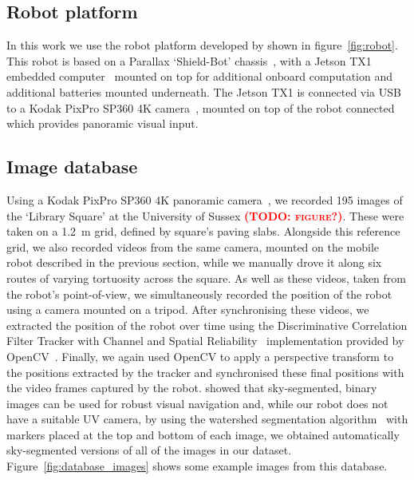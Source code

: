 \documentclass[letterpaper]{article}
\newcommand{\todo}[1]{\textbf{\textsc{\textcolor{red}{(TODO: #1)}}}}
\begin{document}
\subsection{Robot platform}
\label{sec:robot_platform}
In this work we use the robot platform developed by \citet{Domcsek2018} shown in figure~\ref{fig:robot}.
This robot is based on a Parallax `Shield-Bot' chassis~\citep{ParallaxInc}, with a Jetson TX1 embedded computer~\citep{NVIDIACorporation2016} mounted on top for additional onboard computation and additional batteries mounted underneath. 
The Jetson TX1 is connected via USB to a Kodak PixPro SP360 4K camera~\citep{JKImagingLtd}, mounted on top of the robot connected which provides panoramic visual input.

\subsection{Image database}
\label{sec:image_database}
Using a Kodak PixPro SP360 4K panoramic camera~\citep{JKImagingLtd}, we recorded 195 images of the ‘Library Square’ at the University of Sussex \todo{figure?}. 
These were taken on a \SI{1.2}{\metre} grid, defined by square’s paving slabs. 
Alongside this reference grid, we also recorded videos from the same camera, mounted on the mobile robot described in the previous section, while we manually drove it along six routes of varying tortuosity across the square. 
As well as these videos, taken from the robot’s point-of-view, we simultaneously recorded the position of the robot using a camera mounted on a tripod. 
After synchronising these videos, we extracted the position of the robot over time using the Discriminative Correlation Filter Tracker with Channel and Spatial Reliability~\citep{Lukezic2018} implementation provided by OpenCV~\citep{OpenCV}.
Finally, we again used OpenCV to apply a perspective transform to the positions extracted by the tracker and synchronised these final positions with the video frames captured by the robot. 
\citet{Stone2014} showed that sky-segmented, binary images can be used for robust visual navigation and, while our robot does not have a suitable UV camera, by using the watershed segmentation algorithm~\citep{Beucher1979} with markers placed at the top and bottom of each image, we obtained automatically sky-segmented versions of all of the images in our dataset.
Figure~\ref{fig:database_images} shows some example images from this database.
\end{document}
